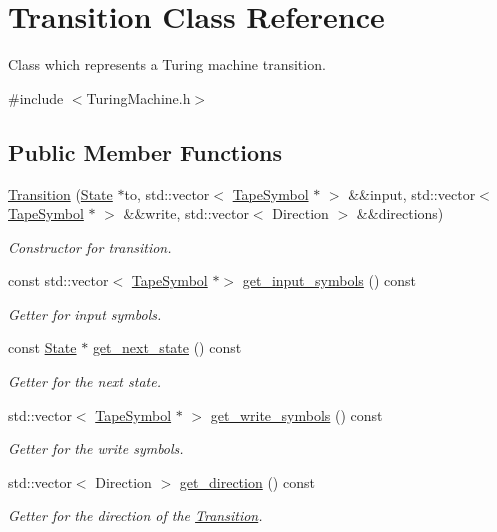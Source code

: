 \hypertarget{classTransition}{}\section{Transition Class Reference}
\label{classTransition}


Class which represents a Turing machine transition.  




{\ttfamily \#include $<$Turing\+Machine.\+h$>$}

\subsection*{Public Member Functions}
\begin{DoxyCompactItemize}
\item 
\hyperlink{classTransition_af32acfec1e8d6b27dee2634e538731f3}{Transition} (\hyperlink{classState}{State} $\ast$to, std\+::vector$<$ \hyperlink{classTapeSymbol}{Tape\+Symbol} $\ast$ $>$ \&\&input, std\+::vector$<$ \hyperlink{classTapeSymbol}{Tape\+Symbol} $\ast$ $>$ \&\&write, std\+::vector$<$ Direction $>$ \&\&directions)
\begin{DoxyCompactList}\small\item\em Constructor for transition. \end{DoxyCompactList}\item 
const std\+::vector$<$ \hyperlink{classTapeSymbol}{Tape\+Symbol} $\ast$$>$ \hyperlink{classTransition_ab7c192c99fa344b7c629b7a570ae148e}{get\+\_\+input\+\_\+symbols} () const
\begin{DoxyCompactList}\small\item\em Getter for input symbols. \end{DoxyCompactList}\item 
const \hyperlink{classState}{State} $\ast$ \hyperlink{classTransition_ae355340b9b802d1783fe3d596e9f1f6d}{get\+\_\+next\+\_\+state} () const
\begin{DoxyCompactList}\small\item\em Getter for the next state. \end{DoxyCompactList}\item 
std\+::vector$<$ \hyperlink{classTapeSymbol}{Tape\+Symbol} $\ast$ $>$ \hyperlink{classTransition_a313ac6ed2730925df3c79eb2ad0ca2b8}{get\+\_\+write\+\_\+symbols} () const
\begin{DoxyCompactList}\small\item\em Getter for the write symbols. \end{DoxyCompactList}\item 
std\+::vector$<$ Direction $>$ \hyperlink{classTransition_a0d4ad2ca5300f0ff1ef6d57f0d40c0f8}{get\+\_\+direction} () const
\begin{DoxyCompactList}\small\item\em Getter for the direction of the \hyperlink{classTransition}{Transition}. \end{DoxyCompactList}\end{DoxyCompactItemize}


